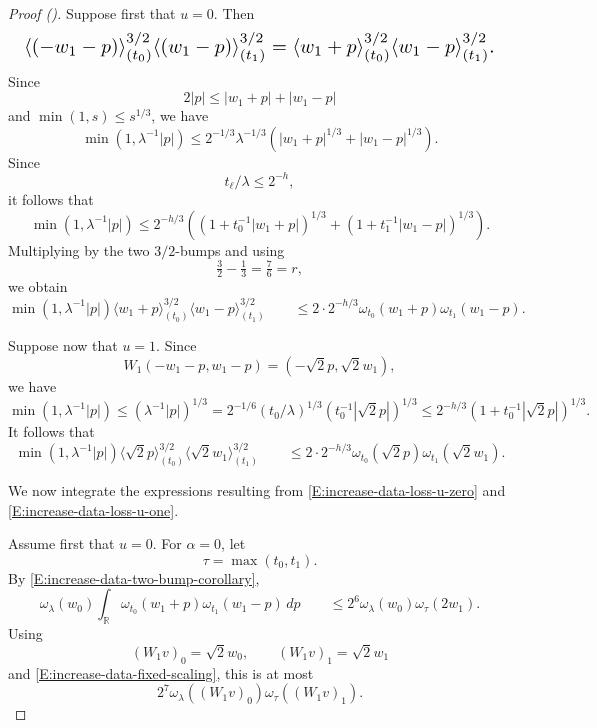 \documentclass[12pt,reqno]{amsart}
\newcommand{\auto}{{({\tiny\faCar})}}
\theoremstyle{plain}
\numberwithin{equation}{section}
\theoremstyle{remark}
\begin{document}
\begin{proof}[Proof \auto]
Suppose first that \(u=0\). Then
\[
\resizebox{0.98\textwidth}{!}{$\displaystyle
\langle(-w_1-p)\rangle_{(t_0)}^{3/2}\langle(w_1-p)\rangle_{(t_1)}^{3/2}
=
\langle w_1+p\rangle_{(t_0)}^{3/2}\langle w_1-p\rangle_{(t_1)}^{3/2}.$}
\]
Since
\[
2|p|
\leq
|w_1+p|+|w_1-p|
\]
and \(\min(1,s)\leq s^{1/3}\), we have
\[
\min(1,\lambda^{-1}|p|)
\leq
2^{-1/3}\lambda^{-1/3}
\left(|w_1+p|^{1/3}+|w_1-p|^{1/3}\right).
\]
Since
\[
t_\ell/\lambda\leq2^{-h},
\]
it follows that
\[
\min(1,\lambda^{-1}|p|)
\leq
2^{-h/3}
\left((1+t_0^{-1}|w_1+p|)^{1/3}+(1+t_1^{-1}|w_1-p|)^{1/3}\right).
\]
Multiplying by the two \(3/2\)-bumps and using
\[
\tfrac32-\tfrac13=\tfrac76=r,
\]
we obtain
\begin{equation}
    \label{E:increase-data-loss-u-zero}
    \min(1,\lambda^{-1}|p|) \langle w_1+p\rangle_{(t_0)}^{3/2} \langle w_1-p\rangle_{(t_1)}^{3/2} \qquad\leq 2 \cdot 2^{-h/3} \omega_{t_0}(w_1+p) \omega_{t_1}(w_1-p).
\end{equation}

Suppose now that \(u=1\). Since
\[
W_1(-w_1-p,w_1-p)
=
(-\sqrt2p,\sqrt2w_1),
\]
we have
\[
\min(1,\lambda^{-1}|p|) \leq (\lambda^{-1}|p|)^{1/3} = 2^{-1/6} (t_0/\lambda)^{1/3} (t_0^{-1}|\sqrt2p|)^{1/3} \leq 2^{-h/3} (1+t_0^{-1}|\sqrt2p|)^{1/3}.
\]
It follows that
\begin{equation}
    \label{E:increase-data-loss-u-one}
    \min(1,\lambda^{-1}|p|) \langle\sqrt2p\rangle_{(t_0)}^{3/2} \langle\sqrt2w_1\rangle_{(t_1)}^{3/2} \qquad\leq 2\cdot 2^{-h/3} \omega_{t_0}(\sqrt2p) \omega_{t_1}(\sqrt2w_1).
\end{equation}

We now integrate the expressions resulting from
\eqref{E:increase-data-loss-u-zero} and
\eqref{E:increase-data-loss-u-one}.

Assume first that \(u=0\). For \(\alpha=0\), let
\[
\tau=\max(t_0,t_1).
\]
By \eqref{E:increase-data-two-bump-corollary},
\[
\omega_\lambda(w_0) \int_{\mathbb R} \omega_{t_0}(w_1+p) \omega_{t_1}(w_1-p)\,dp \qquad\leq 2^6 \omega_\lambda(w_0) \omega_\tau(2w_1).
\]
Using
\[
(W_1v)_0=\sqrt2w_0,
\qquad
(W_1v)_1=\sqrt2w_1
\]
and \eqref{E:increase-data-fixed-scaling}, this is at most
\begin{equation}
    \label{E:increase-data-u0-alpha0}
    2^7
    \omega_\lambda((W_1v)_0)
    \omega_\tau((W_1v)_1).
\end{equation}


\end{proof}
\end{document}
